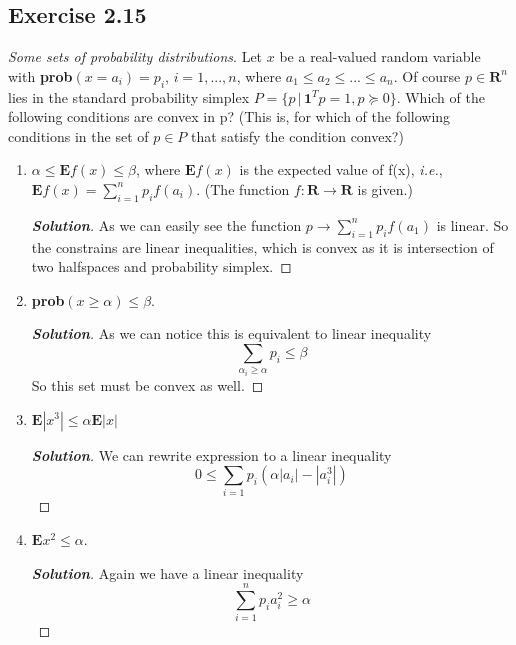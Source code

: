 \documentclass[12pt]{article}
\newenvironment{Solution}
  {\begin{proof}[\textbf{Solution}]}
  {\end{proof}}
\begin{document}
\subsection*{Exercise 2.15}
\textit{Some sets of probability distributions}. Let \(x\) be a real-valued random variable with \textbf{prob}\((x = a_i) = p_i\), \(i = 1,...,n\), where \(a_1 \leq a_2 \leq ... \leq a_n\). Of course \(p \in \mathbf{R}^n\) lies in the standard probability simplex \(P = \{p \, | \, \mathbf{1}^T p = 1, p \succeq 0\}\).
Which of the following conditions are convex in p? (This is, for which of the following conditions in the set of \(p \in P\) that satisfy the condition convex?)
\begin{enumerate}[label=(\alph*)]
	\item
	      \(\alpha \leq \mathbf{E}f(x) \leq \beta\), where \(\mathbf{E}f(x)\) is the expected value of f(x), \textit{i.e.}, \(\mathbf{E}f(x) = \sum_{i=1}^n p_i f(a_i)\). (The function \(f:\mathbf{R} \rightarrow \mathbf{R}\) is given.)
	      \begin{Solution}
		      As we can easily see the function \(p \rightarrow \sum_{i=1}^n p_i f(a_1)\) is linear. So the constrains are linear inequalities, which is convex as it is intersection of two halfspaces and probability simplex.
	      \end{Solution}

	\item
	      \textbf{prob}\((x \ge \alpha) \leq \beta\).
	      \begin{Solution}
		      As we can notice this is equivalent to linear inequality
		      \[
			      \sum_{\alpha_i \ge \alpha}p_i \leq \beta
		      \]
		      So this set must be convex as well.
	      \end{Solution}

	\item
	      \(\mathbf{E}|x^3| \leq \alpha \mathbf{E} |x|\)
	      \begin{Solution}
		      We can rewrite expression to a linear inequality
		      \[
			      0 \leq \sum_{i=1} p_i(\alpha |a_i| - |a_i^3|)
		      \]
	      \end{Solution}

	\item
	      \(\mathbf{E}x^2 \leq \alpha\).
	      \begin{Solution}
		      Again we have a linear inequality
		      \[
			      \sum_{i=1}^n p_i a_i^2 \geq \alpha
		      \]
	      \end{Solution}


\end{enumerate}
\end{document}
